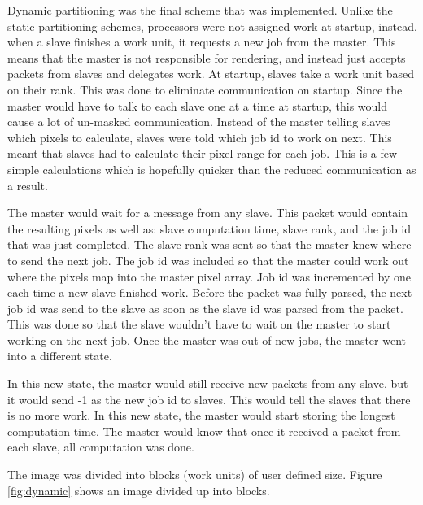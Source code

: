 \documentclass[11pt]{article}
\begin{document}
		Dynamic partitioning was the final scheme that was implemented. Unlike the static partitioning schemes, processors were not assigned work at startup, instead, when a slave finishes a work unit, it requests a new job from the master. This means that the master is not responsible for rendering, and instead just accepts packets from slaves and delegates work. At startup, slaves take a work unit based on their rank. This was done to eliminate communication on startup. Since the master would have to talk to each slave one at a time at startup, this would cause a lot of un-masked communication. Instead of the master telling slaves which pixels to calculate, slaves were told which job id to work on next. This meant that slaves had to calculate their pixel range for each job. This is a few simple calculations which is hopefully quicker than the reduced communication as a result.
		
		The master would wait for a message from any slave. This packet would contain the resulting pixels as well as: slave computation time, slave rank, and the job id that was just completed. The slave rank was sent so that the master knew where to send the next job. The job id was included so that the master could work out where the pixels map into the master pixel array. Job id was incremented by one each time a new slave finished work. Before the packet was fully parsed, the next job id was send to the slave as soon as the slave id was parsed from the packet. This was done so that the slave wouldn't have to wait on the master to start working on the next job. Once the master was out of new jobs, the master went into a different state. 
		
		In this new state, the master would still receive new packets from any slave, but it would send -1 as the new job id to slaves. This would tell the slaves that there is no more work. In this new state, the master would start storing the longest computation time. The master would know that once it received a packet from each slave, all computation was done. 
		
		 The image was divided into blocks (work units) of user defined size. Figure \ref{fig:dynamic} shows an image divided up into blocks.
		
\end{document}

